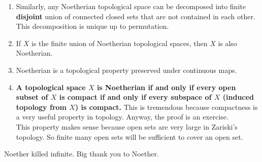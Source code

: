 \documentclass[15pt]{scrartcl}
\begin{document}
\begin{itemize}
\begin{enumerate}
    With this fact, we can more or less assume our ground algebraic set $X$ is irreducible because we can always decompose it into irreducible components.
    \item Similarly, any Noetherian topological space can be decomposed into finite \textbf{disjoint} union of connected closed sets that are not contained in each other. This decomposition is unique up to permutation. 
    \item If $X$ is the finite union of Noetherian topological spaces, then $X$ is also Noetherian.
    \item Noetherian is a topological property preserved under continuous maps.
    \item \textbf{A topological space $X$ is Noetherian if and only if every open subset of $X$ is compact if and only if every subspace of $X$ (induced topology from $X$)  is compact.} This is tremendous because compactness is a very useful property in topology. Anyway, the proof is an exercise. 
    \\

    This property makes sense because open sets are very large in Zariski's topology. So finite many open sets will be sufficient to cover an open set.
    \end{enumerate}
    \begin{remark}
        Noether killed infinite. Big thank you to Noether. 
    \end{remark}

\end{itemize}
\end{document}
